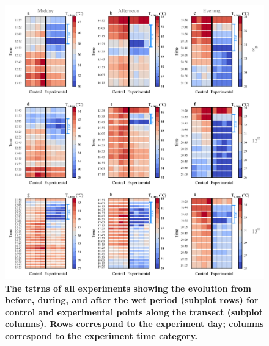 \documentclass[final,3p,times,authoryear]{elsarticle}
\begin{document}
\begin{figure}
\centering
\includegraphics[trim={0 0 0 0},clip,scale=0.9]{all_infared.png}
\caption{\bf The \gls{tstrns} of all experiments showing the evolution from before, during, and after the wet period (subplot rows) for control and experimental points along the transect (subplot columns). Rows correspond to the experiment day; columns correspond to the experiment time category.}
 \label{fig:7.15}
\end{figure}


\end{document}
